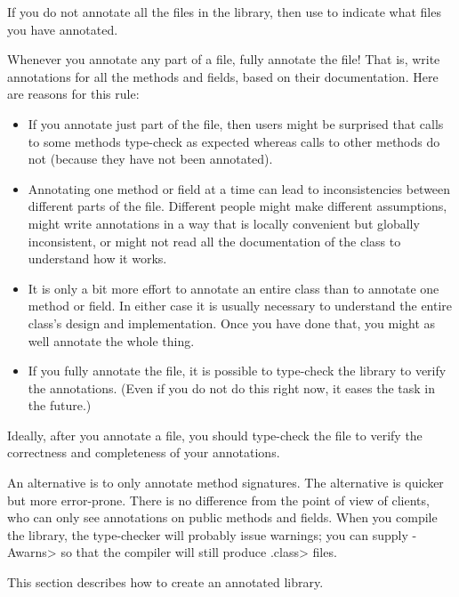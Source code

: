 If you do not annotate all the files in the library, then use
 to indicate what files you have
annotated.

Whenever you annotate any part of a file, fully annotate the file!  That
is, write annotations for all the methods and fields, based on their
documentation.  Here are reasons for this rule:

\begin{itemize}
\item
  If you annotate just part of the file, then users might be surprised that
  calls to some methods type-check as expected whereas calls to other
  methods do not (because they have not been annotated).
\item
  Annotating one method or field at a time can lead to inconsistencies
  between different parts of the file.  Different people might make different
  assumptions, might write annotations in a way that is locally convenient
  but globally inconsistent, or might not read all the documentation of the
  class to understand how it works.
\item
  It is only a bit more effort to annotate an entire class than to annotate one
  method or field.  In either case it is usually necessary to understand the entire
  class's design and implementation.  Once you have done that, you might as
  well annotate the whole thing.
\item
  If you fully annotate the file, it is possible to type-check the library to
  verify the annotations.  (Even if you do not do this right now, it eases
  the task in the future.)
\end{itemize}



Ideally, after you annotate a file, you should type-check the file to verify
the correctness and completeness of your annotations.

An alternative is to
only annotate method signatures.  The alternative is quicker but more
error-prone.  There is no difference from the point of view of clients,
who can only see annotations on public methods and fields.  When you
compile the library, the type-checker will probably issue warnings; you can
supply \<-Awarns> so that the
compiler will still produce \<.class> files.



This section describes how to create an annotated library.

